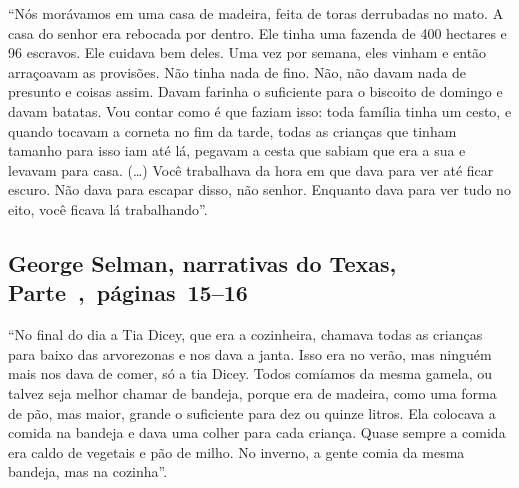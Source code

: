 ``Nós morávamos em uma casa de madeira, feita de toras derrubadas no
mato. A casa do senhor era rebocada por dentro. Ele tinha uma fazenda de
400 hectares e 96 escravos. Ele cuidava bem deles. Uma vez por semana,
eles vinham e então arraçoavam as provisões. Não tinha nada de fino.
Não, não davam nada de presunto e coisas assim. Davam farinha o
suficiente para o biscoito de domingo e davam batatas. Vou contar como é
que faziam isso: toda família tinha um cesto, e quando tocavam a corneta
no fim da tarde, todas as crianças que tinham tamanho para isso iam até
lá, pegavam a cesta que sabiam que era a sua e levavam para casa.
(\ldots{}) Você trabalhava da hora em que dava para ver até ficar
escuro. Não dava para escapar disso, não senhor. Enquanto dava para ver
tudo no eito, você ficava lá trabalhando''.

\subsection{George Selman, narrativas do Texas, Parte~,~páginas~15--16}
\label{ref235}

``No final do dia a Tia Dicey, que era a cozinheira, chamava todas as
crianças para baixo das arvorezonas e nos dava a janta. Isso era no
verão, mas ninguém mais nos dava de comer, só a tia Dicey. Todos
comíamos da mesma gamela, ou talvez seja melhor chamar de bandeja,
porque era de madeira, como uma forma de pão, mas maior, grande o
suficiente para dez ou quinze litros. Ela colocava a comida na bandeja e
dava uma colher para cada criança. Quase sempre a comida era caldo de
vegetais e pão de milho. No inverno, a gente comia da mesma bandeja, mas
na cozinha''.

